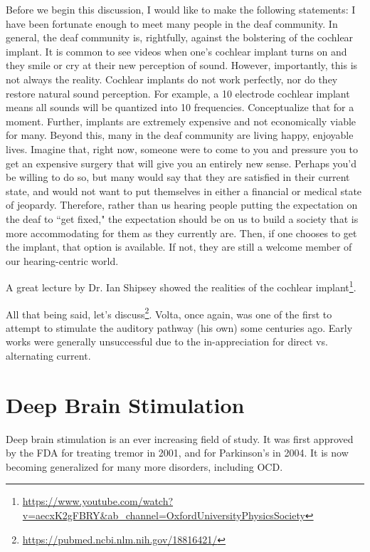 Before we begin this discussion, I would like to make the following statements: I have been fortunate enough to meet many people in the deaf community. In general, the deaf community is, rightfully, against the bolstering of the cochlear implant. It is common to see videos when one's cochlear implant turns on and they smile or cry at their new perception of sound. However, importantly, this is not always the reality. Cochlear implants do not work perfectly, nor do they restore natural sound perception. For example, a 10 electrode cochlear implant means all sounds will be quantized into 10 frequencies. Conceptualize that for a moment. Further, implants are extremely expensive and not economically viable for many. Beyond this, many in the deaf community are living happy, enjoyable lives. Imagine that, right now, someone were to come to you and pressure you to get an expensive surgery that will give you an entirely new sense. Perhaps you'd be willing to do so, but many would say that they are satisfied in their current state, and would not want to put themselves in either a financial or medical state of jeopardy. Therefore, rather than us hearing people putting the expectation on the deaf to ``get fixed," the expectation should be on us to build a society that is more accommodating for them as they currently are. Then, if one chooses to get the implant, that option is available. If not, they are still a welcome member of our hearing-centric world.\newline 

A great lecture by Dr. Ian Shipsey showed the realities of the cochlear implant\footnote{\url{https://www.youtube.com/watch?v=aecxK2gFBRY&ab_channel=OxfordUniversityPhysicsSociety}}. \newline

All that being said, let's discuss\footnote{\url{https://pubmed.ncbi.nlm.nih.gov/18816421/}}. Volta, once again, was one of the first to attempt to stimulate the auditory pathway (his own) some centuries ago. Early works were generally unsuccessful due to the in-appreciation for direct vs. alternating current. 


\section{Deep Brain Stimulation}

Deep brain stimulation is an ever increasing field of study. It was first approved by the FDA for treating tremor in 2001, and for Parkinson's in 2004. It is now becoming generalized for many more disorders, including OCD. 


